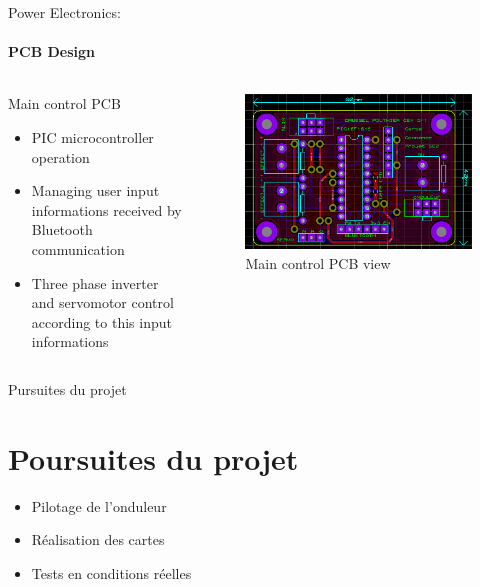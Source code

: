 \documentclass{beamer}
\begin{document}
	\begin{frame}{Power Electronics:}
		\framesubtitle{PCB Design}
		\begin{columns}[T]
	  		\begin{column}{0.5\textwidth}
	  			Main control PCB
		    	\begin{itemize}
		    		\item PIC microcontroller operation
		    		\item Managing user input informations received by Bluetooth communication
		    		\item Three phase inverter and servomotor control according to this input informations
		    	\end{itemize}
	  		\end{column}
	  		\begin{column}{0.5\textwidth}
	  			\begin{figure}
	  				\begin{center}
	  					\includegraphics[height=0.4\textheight]{../Illus/PCB_Main.PNG}
	  				\end{center}
	    			\caption{Main control PCB view}
	    		\end{figure}
	  		\end{column}
		\end{columns}
	\end{frame}
	
	\begin{frame}{Pursuites du projet}
		\section[Poursuites]{Poursuites du projet}
		\begin{itemize}
		    \item Pilotage de l'onduleur
		    \item Réalisation des cartes	
		    \item Tests en conditions réelles
		\end{itemize}
	\end{frame}
	
\end{document}
